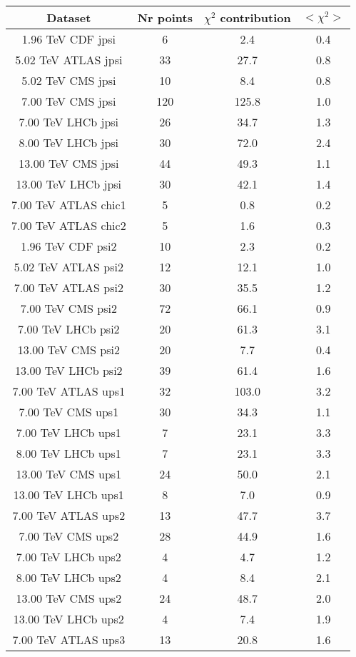 \begin{table}[h!]
\centering
\begin{tabular}{c|c|c|c}
Dataset & Nr points & $\chi^2$ contribution & $<\chi^2>$ \\
\hline
1.96 TeV CDF jpsi & 6 & 2.4 & 0.4 \\
5.02 TeV ATLAS jpsi & 33 & 27.7 & 0.8 \\
5.02 TeV CMS jpsi & 10 & 8.4 & 0.8 \\
7.00 TeV CMS jpsi & 120 & 125.8 & 1.0 \\
7.00 TeV LHCb jpsi & 26 & 34.7 & 1.3 \\
8.00 TeV LHCb jpsi & 30 & 72.0 & 2.4 \\
13.00 TeV CMS jpsi & 44 & 49.3 & 1.1 \\
13.00 TeV LHCb jpsi & 30 & 42.1 & 1.4 \\
7.00 TeV ATLAS chic1 & 5 & 0.8 & 0.2 \\
7.00 TeV ATLAS chic2 & 5 & 1.6 & 0.3 \\
1.96 TeV CDF psi2 & 10 & 2.3 & 0.2 \\
5.02 TeV ATLAS psi2 & 12 & 12.1 & 1.0 \\
7.00 TeV ATLAS psi2 & 30 & 35.5 & 1.2 \\
7.00 TeV CMS psi2 & 72 & 66.1 & 0.9 \\
7.00 TeV LHCb psi2 & 20 & 61.3 & 3.1 \\
13.00 TeV CMS psi2 & 20 & 7.7 & 0.4 \\
13.00 TeV LHCb psi2 & 39 & 61.4 & 1.6 \\
7.00 TeV ATLAS ups1 & 32 & 103.0 & 3.2 \\
7.00 TeV CMS ups1 & 30 & 34.3 & 1.1 \\
7.00 TeV LHCb ups1 & 7 & 23.1 & 3.3 \\
8.00 TeV LHCb ups1 & 7 & 23.1 & 3.3 \\
13.00 TeV CMS ups1 & 24 & 50.0 & 2.1 \\
13.00 TeV LHCb ups1 & 8 & 7.0 & 0.9 \\
7.00 TeV ATLAS ups2 & 13 & 47.7 & 3.7 \\
7.00 TeV CMS ups2 & 28 & 44.9 & 1.6 \\
7.00 TeV LHCb ups2 & 4 & 4.7 & 1.2 \\
8.00 TeV LHCb ups2 & 4 & 8.4 & 2.1 \\
13.00 TeV CMS ups2 & 24 & 48.7 & 2.0 \\
13.00 TeV LHCb ups2 & 4 & 7.4 & 1.9 \\
7.00 TeV ATLAS ups3 & 13 & 20.8 & 1.6 \\

\end{tabular}
\end{table}
